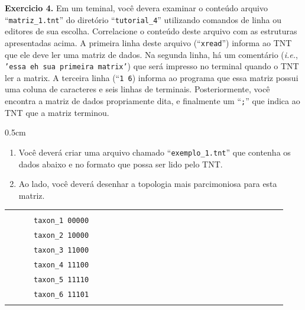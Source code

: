 \begin{refsection}
\begin{blackBlock}{\textbf{Exercicio 4.}}\label{tut4:ex:4.1}
Em um teminal, você devera examinar o conteúdo arquivo ``\texttt{matriz\_1.tnt}'' do diretório  ``\texttt{tutorial\_4}'' utilizando comandos de linha ou editores de sua escolha. Correlacione o conteúdo deste arquivo com as estruturas apresentadas acima. A primeira linha deste arquivo (``\texttt{xread}'') informa ao TNT que ele deve ler uma matriz de dados. Na segunda linha, há um comentário (\textit{i.e.}, \texttt{'essa eh sua primeira matrix'}) que será impresso no terminal quando o TNT ler a matrix. A terceira linha (``\texttt{1 6}) informa ao programa que essa matriz possui uma coluna de caracteres e seis linhas de terminais. Posteriormente, você encontra a matriz de dados propriamente dita, e finalmente um ``\texttt{;}'' que indica ao TNT que a matriz terminou.

\begin {myindentpar}{0.5cm}
\begin{enumerate}[\itshape i.]
	\item{Você deverá criar uma arquivo chamado ``\texttt{exemplo\_1.tnt}'' que contenha os dados abaixo e no formato que possa ser lido pelo TNT.}\label{tut4:input:ex1:matriz}

	\item{Ao lado, você deverá desenhar a topologia mais parcimoniosa para esta matriz.}\label{tut4:input:ex1:tree_manual}\\

\end{enumerate}
\end{myindentpar}
\end{blackBlock}

\begin{table}[H]
\begin{tabular}{|l|l|}
\hline
 & \\
~~~~~~\texttt{taxon\_1 00000}~~~~~~ & ~~~~~~~~~~~~~~~~~~~~~~~~~~~~~~~~~~~~~~ \\
~~~~~~\texttt{taxon\_2 10000}~~~~~~ & ~~~~~~~~~~~~~~~~~~~~~~~~~~~~~~~~~~~~~~ \\
~~~~~~\texttt{taxon\_3 11000}~~~~~~ & ~~~~~~~~~~~~~~~~~~~~~~~~~~~~~~~~~~~~~~ \\
~~~~~~\texttt{taxon\_4 11100}~~~~~~ & ~~~~~~~~~~~~~~~~~~~~~~~~~~~~~~~~~~~~~~ \\
~~~~~~\texttt{taxon\_5 11110}~~~~~~ & ~~~~~~~~~~~~~~~~~~~~~~~~~~~~~~~~~~~~~~ \\
~~~~~~\texttt{taxon\_6 11101}~~~~~~ & ~~~~~~~~~~~~~~~~~~~~~~~~~~~~~~~~~~~~~~ \\
 & \\\hline
\end{tabular}
\end{table}





\end{refsection}
